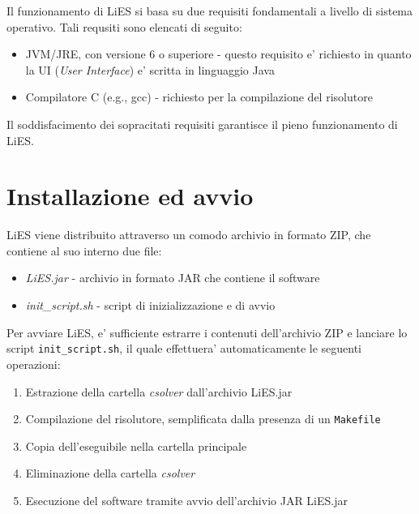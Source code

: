 \documentclass{article}
\begin{document}
Il funzionamento di LiES si basa su due requisiti fondamentali a livello di sistema operativo. Tali requsiti sono elencati di seguito:

\begin{itemize}
	\item JVM/JRE, con versione 6 o superiore - questo requisito e' richiesto in quanto la UI (\textit{User Interface}) e' scritta in linguaggio Java
	\item Compilatore C (e.g., gcc) - richiesto per la compilazione del risolutore
\end{itemize}

Il soddisfacimento dei sopracitati requisiti garantisce il pieno funzionamento di LiES.


\section{Installazione ed avvio}
\label{sec:installazione_avvio}

LiES viene distribuito attraverso un comodo archivio in formato ZIP, che contiene al suo interno due file:
\begin{itemize}
	\item {\emph{LiES.jar}} - archivio in formato JAR che contiene il software
	\item {\emph{init\_script.sh}} - script di inizializzazione e di avvio
\end{itemize}

Per avviare LiES, e' sufficiente estrarre i contenuti dell'archivio ZIP e lanciare lo script \verb+init_script.sh+, il quale effettuera' automaticamente le seguenti operazioni:
\begin{enumerate}
	\item Estrazione della cartella \textit{csolver} dall'archivio LiES.jar
	\item Compilazione del risolutore, semplificata dalla presenza di un \verb+Makefile+
	\item Copia dell'eseguibile nella cartella principale
	\item Eliminazione della cartella \textit{csolver}
	\item Esecuzione del software tramite avvio dell'archivio JAR LiES.jar
\end{enumerate}
\end{document}
